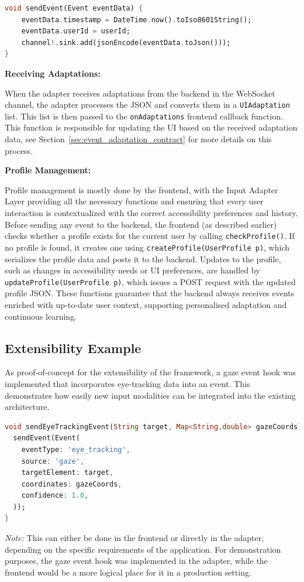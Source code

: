 \documentclass[openany]{book}
\begin{document}
\begin{lstlisting}[language=Dart,basicstyle=\ttfamily\small,caption={sendEvent: serialize and send over WS}]
void sendEvent(Event eventData) {
    eventData.timestamp = DateTime.now().toIso8601String();
    eventData.userId = userId;
    channel!.sink.add(jsonEncode(eventData.toJson()));
}
\end{lstlisting}

\textbf{Receiving Adaptations:}

When the adapter receives adaptations from the backend in the WebSocket channel, the adapter processes the JSON and converts them in a \texttt{UIAdaptation} list. This list is then passed to the \texttt{onAdaptations} frontend callback function. This function is responsible for updating the UI based on the received adaptation data, see Section~\ref{sec:event_adaptation_contract} for more details on this process.

\textbf{Profile Management:}

Profile management is mostly done by the frontend, with the Input Adapter Layer providing all the necessary functions and ensuring that every user interaction is contextualized with the correct accessibility preferences and history. Before sending any event to the backend, the frontend (as described earlier) checks whether a profile exists for the current user by calling \texttt{checkProfile()}. If no profile is found, it creates one using \texttt{createProfile(UserProfile p)}, which serializes the profile data and posts it to the backend. Updates to the profile, such as changes in accessibility needs or UI preferences, are handled by \texttt{updateProfile(UserProfile p)}, which issues a POST request with the updated profile JSON. These functions guarantee that the backend always receives events enriched with up-to-date user context, supporting personalised adaptation and continuous learning.

\subsection{Extensibility Example}
As proof-of-concept for the extensibility of the framework, a gaze event hook was implemented that incorporates eye-tracking data into an event. This demonstrates how easily new input modalities can be integrated into the existing architecture.
\begin{lstlisting}[language=Dart,basicstyle=\ttfamily\small,caption={Gaze event hook (testing harness)}]
void sendEyeTrackingEvent(String target, Map<String,double> gazeCoords) {
  sendEvent(Event(
    eventType: 'eye_tracking',
    source: 'gaze',
    targetElement: target,
    coordinates: gazeCoords,
    confidence: 1.0,
  ));
}
\end{lstlisting}
\textit{Note:} This can either be done in the frontend or directly in the adapter, depending on the specific requirements of the application. For demonstration purposes, the gaze event hook was implemented in the adapter, while the frontend would be a more logical place for it in a production setting.
\end{document}
